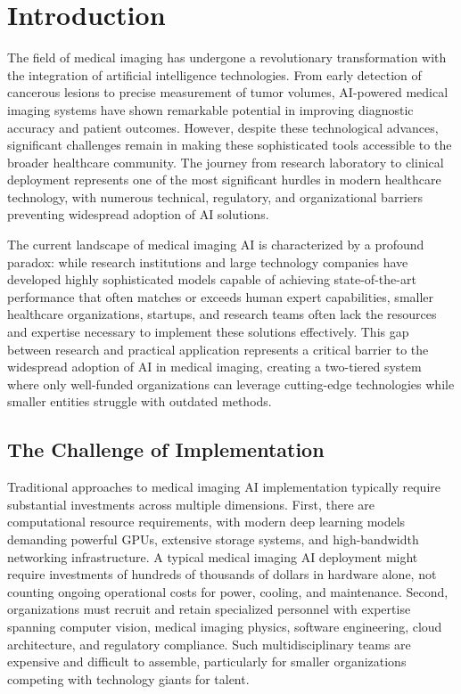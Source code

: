 \documentclass[12pt,a4paper]{article}
\begin{document}
\newpage
\tableofcontents
\newpage

\section{Introduction}

The field of medical imaging has undergone a revolutionary transformation with the integration of artificial intelligence technologies. From early detection of cancerous lesions to precise measurement of tumor volumes, AI-powered medical imaging systems have shown remarkable potential in improving diagnostic accuracy and patient outcomes. However, despite these technological advances, significant challenges remain in making these sophisticated tools accessible to the broader healthcare community. The journey from research laboratory to clinical deployment represents one of the most significant hurdles in modern healthcare technology, with numerous technical, regulatory, and organizational barriers preventing widespread adoption of AI solutions.

The current landscape of medical imaging AI is characterized by a profound paradox: while research institutions and large technology companies have developed highly sophisticated models capable of achieving state-of-the-art performance that often matches or exceeds human expert capabilities, smaller healthcare organizations, startups, and research teams often lack the resources and expertise necessary to implement these solutions effectively. This gap between research and practical application represents a critical barrier to the widespread adoption of AI in medical imaging, creating a two-tiered system where only well-funded organizations can leverage cutting-edge technologies while smaller entities struggle with outdated methods.

\subsection{The Challenge of Implementation}

Traditional approaches to medical imaging AI implementation typically require substantial investments across multiple dimensions. First, there are computational resource requirements, with modern deep learning models demanding powerful GPUs, extensive storage systems, and high-bandwidth networking infrastructure. A typical medical imaging AI deployment might require investments of hundreds of thousands of dollars in hardware alone, not counting ongoing operational costs for power, cooling, and maintenance. Second, organizations must recruit and retain specialized personnel with expertise spanning computer vision, medical imaging physics, software engineering, cloud architecture, and regulatory compliance. Such multidisciplinary teams are expensive and difficult to assemble, particularly for smaller organizations competing with technology giants for talent.
\end{document}
